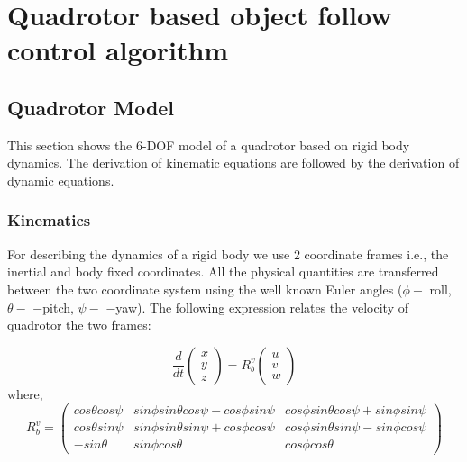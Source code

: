 \chapter{Quadrotor based object follow control algorithm}

	\section{Quadrotor Model}
	\label{sec:Quadrotor Model}
	
	This section shows the 6-DOF model of a quadrotor based on rigid body dynamics. The derivation of kinematic equations are followed by the derivation
	of dynamic equations.~\cite{drone}
	
	\subsection{Kinematics}
	\label{sec:Kinematics}
	For describing the dynamics of a rigid body we use 2 coordinate frames
	i.e., the inertial and body fixed coordinates. All the physical quantities are
	transferred between the two coordinate system using the well known Euler
	angles ($\phi -$ roll, $\theta -$ −pitch, $\psi -$ −yaw). The following expression relates the velocity of quadrotor the two frames:
	
	\begin{equation}
	\frac{d}{dt}\begin{pmatrix}
	x\\y\\z
	\end{pmatrix} = R^{v}_b\begin{pmatrix}
	u\\v\\w
	\end{pmatrix}
	\end{equation}
	where,
	\begin{equation}
	R^{v}_b = \begin{pmatrix}
	cos\theta cos\psi & sin\phi sin\theta cos\psi - cos\phi sin\psi & cos\phi sin\theta cos\psi + sin\phi sin\psi \\
	cos\theta sin\psi & sin\phi sin\theta sin\psi + cos\phi cos\psi & cos\phi sin\theta sin\psi - sin\phi cos\psi \\
	- sin\theta & sin\phi cos\theta & cos\phi cos\theta
	\end{pmatrix}
	\end{equation}
	
